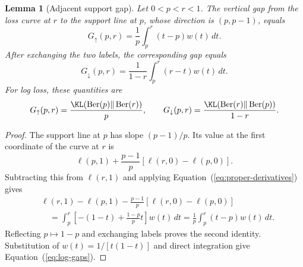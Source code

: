 \documentclass{article}
\newtheorem{lemma}{Lemma}
\newcommand{\Ber}{\operatorname{Ber}}
\begin{document}
\begin{lemma}[Adjacent support gap]
\label{lem:general-gap}
Let $0<p<r<1$. The vertical gap from the loss curve at $r$ to the support line at $p$, whose direction is $(p,p-1)$, equals
\begin{equation}
 G_{\uparrow}(p,r)
 =\frac1p\int_p^r(t-p)w(t)\,dt.
 \label{eq:general-upper-gap}
\end{equation}
After exchanging the two labels, the corresponding gap equals
\begin{equation}
 G_{\downarrow}(p,r)
 =\frac1{1-r}\int_p^r(r-t)w(t)\,dt.
 \label{eq:general-lower-gap}
\end{equation}
For log loss, these quantities are
\begin{equation}
 G_{\uparrow}(p,r)=\frac{\KL(\Ber(p)\Vert\Ber(r))}{p},
 \qquad
 G_{\downarrow}(p,r)=
 \frac{\KL(\Ber(r)\Vert\Ber(p))}{1-r}.
 \label{eq:log-gaps}
\end{equation}
\end{lemma}

\begin{proof}
The support line at $p$ has slope $(p-1)/p$. Its value at the first coordinate of the curve at $r$ is \[ \ell(p,1)+\frac{p-1}{p}[\ell(r,0)-\ell(p,0)]. \] Subtracting this from $\ell(r,1)$ and applying Equation~(\ref{eq:proper-derivatives}) gives
\begin{align*}
 &\ell(r,1)-\ell(p,1)
 -\frac{p-1}{p}[\ell(r,0)-\ell(p,0)]\\
 &\quad=\int_p^r
 \left[-(1-t)+\frac{1-p}{p}t\right]w(t)\,dt
 =\frac1p\int_p^r(t-p)w(t)\,dt.
\end{align*}
Reflecting $p\mapsto1-p$ and exchanging labels proves the second identity. Substitution of $w(t)=1/[t(1-t)]$ and direct integration give Equation~(\ref{eq:log-gaps}).
\end{proof}
\end{document}
